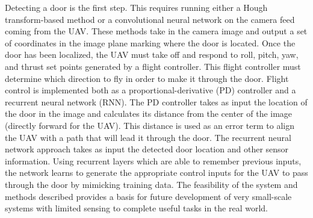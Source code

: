\documentclass[12pt]{article}
\begin{document}
Detecting a door is the first step. This requires running either a Hough transform-based method or a convolutional neural network on the camera feed coming from the UAV. These methods take in the camera image and output a set of coordinates in the image plane marking where the door is located. Once the door has been localized, the UAV must take off and respond to roll, pitch, yaw, and thrust set points generated by a flight controller. This flight controller must determine which direction to fly in order to make it through the door. Flight control is implemented both as a proportional-derivative (PD) controller and a recurrent neural network (RNN). The PD controller takes as input the location of the door in the image and calculates its distance from the center of the image (directly forward for the UAV). This distance is used as an error term to align the UAV with a path that will lead it through the door. The recurrent neural network approach takes as input the detected door location and other sensor information. Using recurrent layers which are able to remember previous inputs, the network learns to generate the appropriate control inputs for the UAV to pass through the door by mimicking training data. The feasibility of the system and methods described provides a basis for future development of very small-scale systems with limited sensing to complete useful tasks in the real world.


\end{document}
